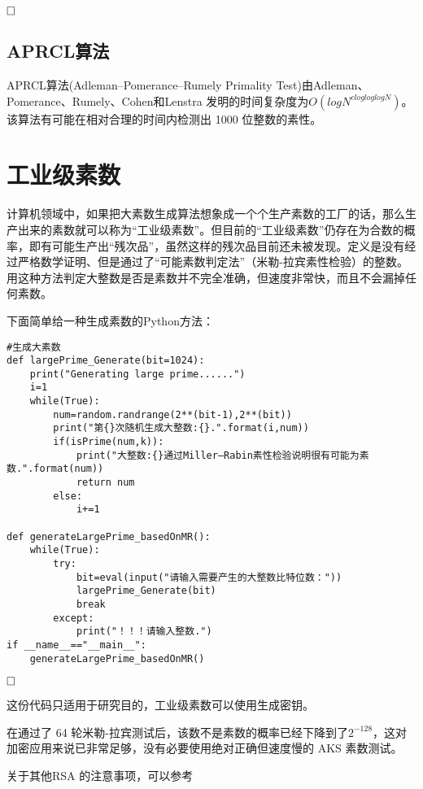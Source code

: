 \documentclass{article}
\begin{document}
$\hfill\square$ 

\subsection{APRCL算法}
APRCL算法(Adleman–Pomerance–Rumely Primality Test)由Adleman、Pomerance、Rumely、Cohen和Lenstra
发明的时间复杂度为$O\left( logN^{c log log log N} \right)$。该算法有可能在相对合理的时间内检测出 1000 位整数的素性。

\section{工业级素数}

计算机领域中，如果把大素数生成算法想象成一个个生产素数的工厂的话，那么生产出来的素数就可以称为“工业级素数”。但目前的“工业级素数”仍存在为合数的概率，即有可能生产出“残次品”，虽然这样的残次品目前还未被发现。定义是没有经过严格数学证明、但是通过了“可能素数判定法”（米勒-拉宾素性检验）的整数。用这种方法判定大整数是否是素数并不完全准确，但速度非常快，而且不会漏掉任何素数。

下面简单给一种生成素数的Python方法：

\begin{lstlisting}
#生成大素数
def largePrime_Generate(bit=1024):
    print("Generating large prime......")
    i=1
    while(True):
        num=random.randrange(2**(bit-1),2**(bit))
        print("第{}次随机生成大整数:{}.".format(i,num))
        if(isPrime(num,k)):
            print("大整数:{}通过Miller—Rabin素性检验说明很有可能为素数.".format(num))
            return num
        else:
            i+=1
            
def generateLargePrime_basedOnMR():
    while(True):
        try:
            bit=eval(input("请输入需要产生的大整数比特位数："))
            largePrime_Generate(bit)
            break
        except:
            print("！！！请输入整数.")
if __name__=="__main__":
    generateLargePrime_basedOnMR()
\end{lstlisting}

$\hfill\square$ 

这份代码只适用于研究目的，工业级素数可以使用\href{https://www.openssl.org/}{\color{blue}{OpenSSL}}生成密钥。

在通过了 64 轮米勒-拉宾测试后，该数不是素数的概率已经下降到了$2^{−128}$，这对加密应用来说已非常足够，没有必要使用绝对正确但速度慢的 AKS 素数测试。

关于其他RSA 的注意事项，可以参考\href{https://zhuanlan.zhihu.com/p/20354745}{\color{blue}{RSA有多安全，有多不安全？}}
\end{document}
